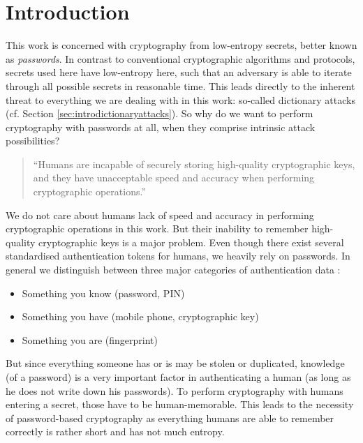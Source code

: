 
\chapter{Introduction}  %

\ifpdf
    \graphicspath{{Chapters/Figs/Raster/}{Chapters/Figs/PDF/}{Chapters/Figs/}}
\else
    \graphicspath{{Chapters/Figs/Vector/}{Chapters/Figs/}}
\fi

This work is concerned with cryptography from low-entropy secrets, better known as \emph{passwords}.
In contrast to conventional cryptographic algorithms and protocols, secrets used here have low-entropy here, such that an adversary is able to iterate through all possible secrets in reasonable time.
This leads directly to the inherent threat to everything we are dealing with in this work: so-called dictionary attacks (cf. Section \ref{sec:introdictionaryattacks}).
So why do we want to perform cryptography with passwords at all, when they comprise intrinsic attack possibilities?

\begin{quote}
``Humans are incapable of securely storing high-quality cryptographic keys, and they have unacceptable speed and accuracy when performing cryptographic operations.''~\citet{Kaufmann02}
\end{quote}

\noindent
We do not care about humans lack of speed and accuracy in performing cryptographic operations in this work.
But their inability to remember high-quality cryptographic keys is a major problem.
Even though there exist several standardised authentication tokens for humans, we heavily rely on passwords.
In general we distinguish between three major categories of authentication data \cite{Burr11}:
\begin{itemize}
	\item Something you know (\eg password, \ac{PIN})
	\item Something you have (\eg mobile phone, cryptographic key)
	\item Something you are (\eg fingerprint)
\end{itemize}
But since everything someone has or is may be stolen or duplicated, knowledge (of a password) is a very important factor in authenticating a human (as long as he does not write down his passwords).
To perform cryptography with humans entering a secret, those have to be human-memorable.
This leads to the necessity of password-based cryptography as everything humans are able to remember correctly is rather short and has not much entropy.

